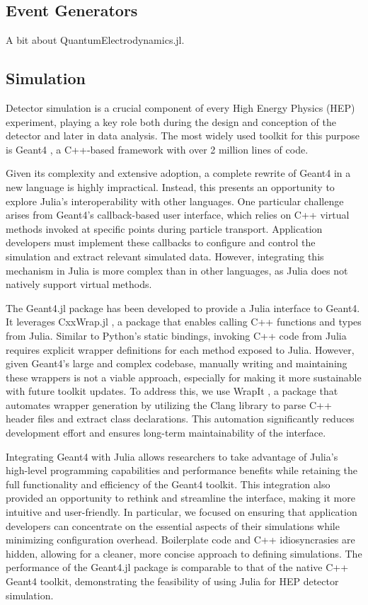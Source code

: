 \documentclass{webofc}
\begin{document}
\subsection{Event Generators}

A bit about QuantumElectrodynamics.jl.

\subsection{Simulation}

Detector simulation is a crucial component of every High Energy Physics (HEP) experiment, playing a key role both during the design and conception of the detector and later in data analysis. The most widely used toolkit for this purpose is Geant4 \cite{GEANT4:2002zbu}, a C++-based framework with over 2 million lines of code.

Given its complexity and extensive adoption, a complete rewrite of Geant4 in a new language is highly impractical. Instead, this presents an opportunity to explore Julia's interoperability with other languages. One particular challenge arises from Geant4's callback-based user interface, which relies on C++ virtual methods invoked at specific points during particle transport. Application developers must implement these callbacks to configure and control the simulation and extract relevant simulated data. However, integrating this mechanism in Julia is more complex than in other languages, as Julia does not natively support virtual methods.

The Geant4.jl \cite{geant4-jl-github} package has been developed to provide a Julia interface to Geant4. It leverages CxxWrap.jl \cite{cxxwrap-jl-github}, a package that enables calling C++ functions and types from Julia. Similar to Python’s static bindings, invoking C++ code from Julia requires explicit wrapper definitions for each method exposed to Julia. However, given Geant4's large and complex codebase, manually writing and maintaining these wrappers is not a viable approach, especially for making it more sustainable with future toolkit updates. To address this, we use WrapIt \cite{wrapit-github}, a package that automates wrapper generation by utilizing the Clang library to parse C++ header files and extract class declarations. This automation significantly reduces development effort and ensures long-term maintainability of the interface.

Integrating Geant4 with Julia allows researchers to take advantage of Julia's high-level programming capabilities and performance benefits while retaining the full functionality and efficiency of the Geant4 toolkit. This integration also provided an opportunity to rethink and streamline the interface, making it more intuitive and user-friendly. In particular, we focused on ensuring that application developers can concentrate on the essential aspects of their simulations while minimizing configuration overhead. Boilerplate code and C++ idiosyncrasies are hidden, allowing for a cleaner, more concise approach to defining simulations. The performance of the Geant4.jl package is comparable to that of the native C++ Geant4 toolkit, demonstrating the feasibility of using Julia for HEP detector simulation.
\end{document}
